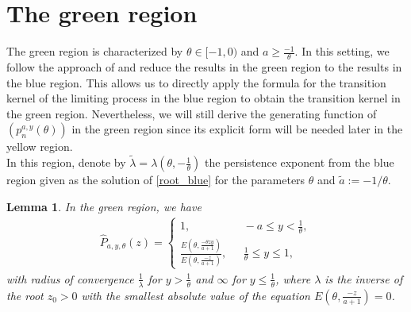 \documentclass[12pt]{article}
\newcommand{\1}{\mathds{1}}
\theoremstyle{definition}
\theoremstyle{plain}
\newtheorem{Lemma}[definition]{Lemma}
\theoremstyle{remark}
\begin{document}
\section{The green region}
The green region is characterized by  $\theta\in[-1,0)$ and $a\geq \frac{-1}{\theta}$. %
 In this setting, we follow the approach of \cite{AurzadaRaschel} and reduce the results in the green region to the results in the blue region. This allows us to directly apply the formula for the transition kernel of the limiting process in the blue region to obtain the transition kernel in the green region.  Nevertheless, we will still derive the generating function of $(p_n^{a,y}(\theta))$ in the green region since its explicit form will be needed later in the yellow region.
 \\In this region, denote by $\tilde{\lambda}=\lambda\left(\theta,-\frac{1}{\theta}\right)$ the persistence exponent from the blue region given as the solution of \eqref{root_blue} for the parameters $\theta$ and $\tilde a:=-1/\theta$.
\begin{Lemma}\label{generatingfunction_grune_region}
    In the green region, we have
\begin{align*}
 \hat{P}_{a,y,\theta}(z)=
    \begin{cases}
            1,~~&~-a\leq y<\frac{1}{\theta},
            \\\frac{E\left(\theta,\frac{-\theta zy}{a+1}\right)}{E\left(\theta,\frac{-z}{a+1}\right)},~~&~\frac{1}{\theta}\le y \leq 1,
        \end{cases}      
\end{align*}
    with radius of convergence $\frac{1}{\lambda}$ for $y>\frac{1}{\theta}$ and $\infty$ for $y\le\frac{1}{\theta}$, where $\lambda$ is the inverse of the root $z_0>0$ with the smallest absolute value of the equation $E\left(\theta,\frac{-z}{a+1}\right)=0$.
    \end{Lemma}
\end{document}
